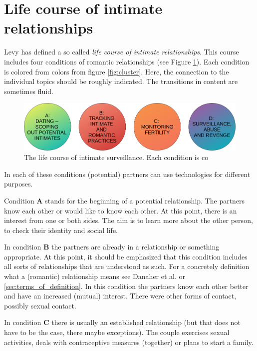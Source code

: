 \section{Life course of intimate relationships}

Levy \cite{levy2014intimate} has defined a so called \textit{life course of intimate relationships}. This course includes four conditions of romantic relationships (see Figure \ref{fig:live_course}). Each condition is colored from colors from figure \ref{fig:cluster}. Here, the connection to the individual topics should be roughly indicated. The transitions in content are sometimes fluid.
\begin{figure}[htb]
    \centering
	\includegraphics[width=\linewidth]{img/life_course_of_intimate_surveillance.png}
	\caption{The life course of intimate surveillance. Each condition is co}
	\label{fig:live_course}
\end{figure}

In each of these conditions (potential) partners can use technologies for different purposes.

Condition \textbf{A} stands for the beginning of a potential relationship. The partners know each other or would like to know each other. At this point, there is an interest from one or both sides. The aim is to learn more about the other person, to check their identity and social life.

In condition \textbf{B} the partners are already in a relationship or something appropriate. At this point, it should be emphasized that this condition includes all sorts of relationships that are understood as such. For a concretely definition what a (romantic) relationship means see Danaher et al. \cite{doi:10.1080/15265161.2017.1409823} or \ref{sec:terms_of_definition}. In this condition the partners know each other better and have an increased (mutual) interest. There were other forms of contact, possibly sexual contact.

In condition \textbf{C} there is usually an established relationship (but that does not have to be the case, there maybe exceptions). The couple exercises sexual activities, deals with contraceptive measures (together) or plans to start a family.

